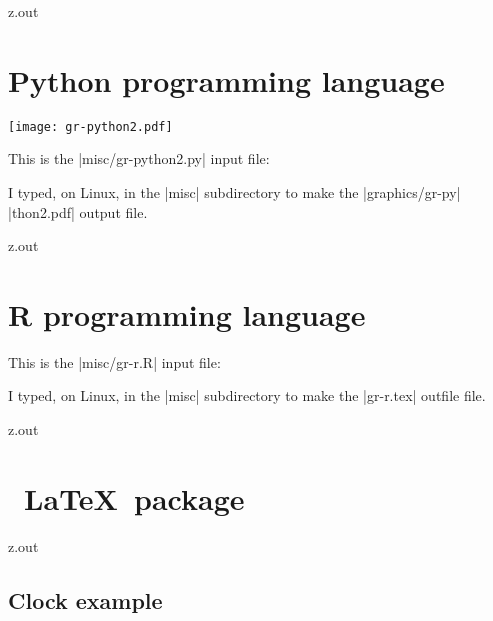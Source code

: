 \begin{VerbatimOut}{z.out}
\section{Python programming language}


\texttt{[image: gr-python2.pdf]}

This is the |misc/gr-python2.py| input file:

I typed, on Linux,
in the |misc| subdirectory
to make the |graphics/gr-py|\\
|thon2.pdf| output file.
\end{VerbatimOut}

\MyIO



\begin{VerbatimOut}{z.out}

\section{R programming language}




This is the |misc/gr-r.R| input file:

I typed, on Linux,
in the |misc| subdirectory to make the |gr-r.tex| outfile file.
\end{VerbatimOut}

\MyIO


\begin{VerbatimOut}{z.out}

\section{\TikZLogo\ \LaTeX\ package}

\end{VerbatimOut}

\MyIO


\begin{VerbatimOut}{z.out}

\subsection{Clock example}
\end{VerbatimOut}

